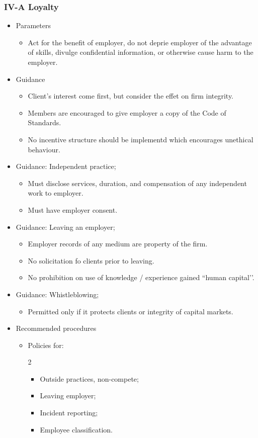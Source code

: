 \documentclass[../notes_compiled.tex]{subfiles}
\begin{document}
\subsubsection{IV-A Loyalty}
\begin{itemize}
\item Parameters
\begin{itemize}
\item Act for the benefit of employer, do not deprie employer of the advantage of skills, divulge confidential information, or otherwise cause harm to the employer.
\end{itemize}
\item Guidance
\begin{itemize}
\item Client’s interest come first, but consider the effet on firm integrity.
\item Members are encouraged to give employer a copy of the Code of Standards.
\item No incentive structure should be implementd which encourages unethical behaviour.
\end{itemize}
\item Guidance: Independent practice;
\begin{itemize}
\item Must disclose services, duration, and compensation of any independent work to employer.
\item Must have employer consent.
\end{itemize}
\item Guidance: Leaving an employer;
\begin{itemize}
\item Employer records of any medium are property of the firm.
\item No solicitation fo clients prior to leaving.
\item No prohibition on use of knowledge / experience gained ``human capital’’.
\end{itemize}
\item Guidance: Whistleblowing;
\begin{itemize}
\item Permitted only if it protects clients or integrity of capital markets.
\end{itemize}
\item Recommended procedures
\begin{itemize}
\item Policies for:
\begin{multicols}{2}
\begin{itemize}
\item Outside practices, non-compete;
\item Leaving employer;
\item Incident reporting;
\item Employee classification.
\end{itemize}
\end{multicols}
\end{itemize}
\end{itemize}
\end{document}
